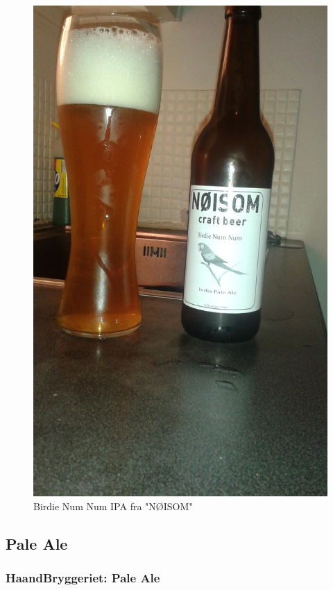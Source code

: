 \documentclass[12pt,a4paper,oneside,norsk]{article}
\begin{document}
\begin{figure} [H]
\centering
\includegraphics[scale=0.1, angle= 270]{Bilder/Ol/birdienumnum}
\caption{Birdie Num Num IPA fra "NØISOM"}
\end{figure}

\newpage
\subsection{Pale Ale}
\subsubsection{HaandBryggeriet: Pale Ale}
\end{document}
